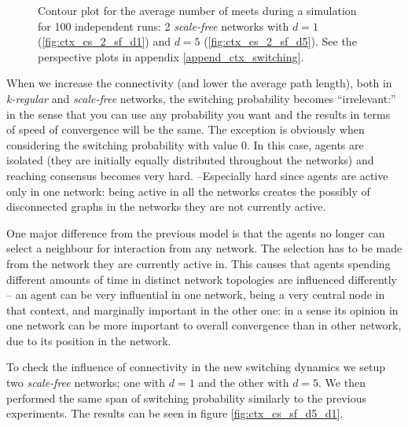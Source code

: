 \documentclass[preprint,number]{elsarticle}
\begin{document}
\begin{figure}[H]
	\begin{minipage}{0.9\linewidth}
		\vspace{0.2cm}
		\caption{Contour plot for the average number of meets during a simulation for 100 independent runs: 2 \textit{scale-free} networks with $d=1$ (\ref{fig:ctx_cs_2_sf_d1}) and $d=5$ (\ref{fig:ctx_cs_2_sf_d5}). See the perspective plots in  appendix \ref{append_ctx_switching}.}
		\label{fig:ctx_cs_2_sf}
	\end{minipage}
\end{figure}

When we increase the connectivity (and lower the average path length), both in \textit{k-regular} and \textit{scale-free} networks, the switching probability becomes ``irrelevant:'' in the sense that you can use any probability you want and the results in terms of speed of convergence will be the same. The exception is obviously when considering the switching probability with value $0$. In this case, agents are isolated (they are initially equally distributed throughout the networks) and reaching consensus becomes very hard. --Especially hard since agents are active only in one network: being active in all the networks creates the possibly of disconnected graphs in the networks they are not currently active.

One major difference from the previous model is that the agents no longer can select a neighbour for interaction from any network. The selection has to be made from the network they are currently active in. This causes that agents spending different amounts of time in distinct network topologies are influenced differently -- an agent can be very influential in one network, being a very central node in that context, and marginally important in the other one: in a sense its opinion in one network can be more important to overall convergence than in other network,  due to its position in the network.

To check the influence of connectivity in the new switching dynamics we setup two \textit{scale-free} networks; one with $d=1$ and the other with $d=5$. We then performed the 
same span of switching probability similarly to the previous experiments. The results can be seen in figure \ref{fig:ctx_cs_sf_d5_d1}.
\end{document}
